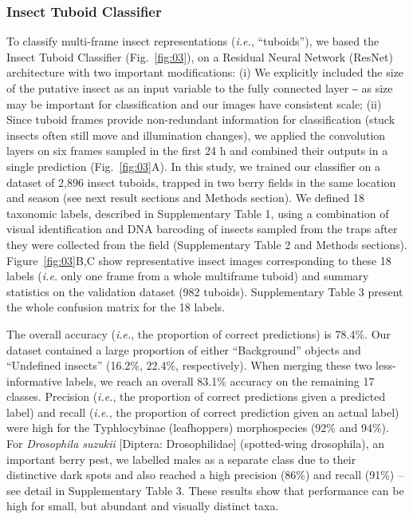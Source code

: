 \documentclass[12pt]{article}
\begin{document}
\begin{linenumbers}
		\subsubsection*{Insect Tuboid Classifier}
		
		To classify multi-frame insect representations (\emph{i.e.}, “tuboids”), we based the Insect Tuboid Classifier (Fig.~\ref{fig:03}), on a Residual Neural Network (ResNet) architecture\cite{he_deep_2016} with two important modifications: (i) We explicitly included the size of the putative insect as an input variable to the fully connected layer ‒ as size may be important for classification and our images have consistent scale; (ii) Since tuboid frames provide non-redundant information for classification (stuck insects often still move and illumination changes), we applied the convolution layers on six frames sampled in the first 24 h and combined their outputs in a single prediction (Fig.~\ref{fig:03}A). In this study, we trained our classifier on a dataset of 2,896 insect tuboids, trapped in two berry fields in the same location and season (see next result sections and Methods section). We defined 18 taxonomic labels, described in Supplementary Table 1, using a combination of visual identification and DNA barcoding of insects sampled from the traps after they were collected from the field (Supplementary Table 2 and Methods sections). Figure~\ref{fig:03}B,C show representative insect images corresponding to these 18 labels (\emph{i.e.} only one frame from a whole multiframe tuboid) and summary statistics on the validation dataset (982 tuboids).
		Supplementary Table 3 present the whole confusion matrix for the 18 labels.
		
		 The overall accuracy (\emph{i.e.}, the proportion of correct predictions) is 78.4\%. Our dataset contained a large proportion of either “Background” objects and “Undefined insects” (16.2\%, 22.4\%, respectively). When merging these two less-informative labels, we reach an overall 83.1\% accuracy on the remaining 17 classes. Precision (\emph{i.e.}, the proportion of correct predictions given a predicted label) and recall (\emph{i.e.}, the proportion of correct prediction given an actual label) were high for the Typhlocybinae (leafhoppers) morphospecies (92\% and 94\%). For \emph{Drosophila suzukii} [Diptera: Drosophilidae] (spotted-wing drosophila), an important berry pest, we labelled males as a separate class due to their distinctive dark spots and also reached a high precision (86\%) and recall (91\%) -- see detail in Supplementary Table 3. These results show that performance can be high for small, but abundant and visually distinct taxa.
		

\end{linenumbers}
\end{document}
